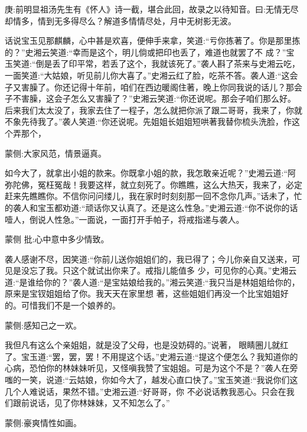 

\begin{parag}
    \begin{note}庚:前明显祖汤先生有《怀人》诗一截，堪合此回，故录之以待知音。曰:无情无尽却情多，情到无多得尽么？解道多情情尽处，月中无树影无波。\end{note}
\end{parag}


\begin{parag}
    话说宝玉见那麒麟，心中甚是欢喜，便伸手来拿，笑道:“亏你拣著了。你是那里拣的？”史湘云笑道:“幸而是这个，明儿倘或把印也丢了，难道也就罢了不 成？”宝玉笑道:“倒是丢了印平常，若丢了这个，我就该死了。”袭人斟了茶来与史湘云吃，一面笑道:“大姑娘，听见前儿你大喜了。”史湘云红了脸，吃茶不答。袭人道:“这会子又害臊了。你还记得十年前，咱们在西边暖阁住著，晚上你同我说的话儿？那会子不害臊，这会子怎么又害臊了？”史湘云笑道:“你还说呢。那会子咱们那么好。后来我们太太没了，我家去住了一程子，怎么就把你派了跟二哥哥，我来了，你就不象先待我了。”袭人笑道:“你还说呢。先姐姐长姐姐短哄著我替你梳头洗脸，作这个弄那个，\begin{note}蒙侧:大家风范，情景逼真。\end{note}如今大了，就拿出小姐的款来。你既拿小姐的款，我怎敢亲近呢？”史湘云道:“阿弥陀佛，冤枉冤哉！我要这样，就立刻死了。你瞧瞧，这么大热天，我来了，必定赶来先瞧瞧你。不信你问问缕儿，我在家时时刻刻那一回不念你几声。”话未了，忙的袭人和宝玉都劝道:“顽话你又认真了。还是这么性急。”史湘云道:“你不说你的话噎人，倒说人性急。”一面说，一面打开手帕子，将戒指递与袭人。\begin{note}蒙侧 批:心中意中多少情致。\end{note}袭人感谢不尽，因笑道:“你前儿送你姐姐们的，我已得了；今儿你亲自又送来，可见是没忘了我。只这个就试出你来了。戒指儿能值多 少，可见你的心真。”史湘云道:“是谁给你的？”袭人道:“是宝姑娘给我的。”湘云笑道:“我只当是林姐姐给你的，原来是宝钗姐姐给了你。我天天在家里想 著，这些姐姐们再没一个比宝姐姐好的。可惜我们不是一个娘养的。\begin{note}蒙侧:感知己之一欢。\end{note}我但凡有这么个亲姐姐，就是没了父母，也是没妨碍的。”说著， 眼睛圈儿就红了。宝玉道:“罢，罢，罢！不用提这个话。”史湘云道:“提这个便怎么？我知道你的心病，恐怕你的林妹妹听见，又怪嗔我赞了宝姐姐。可是为这个不是？”袭人在旁嗤的一笑，说道:“云姑娘，你如今大了，越发心直口快了。”宝玉笑道:“我说你们这几个人难说话，果然不错。”史湘云道:“好哥哥，你 不必说话教我恶心。只会在我们跟前说话，见了你林妹妹，又不知怎么了。”\begin{note}蒙侧:豪爽情性如画。\end{note}
\end{parag}


